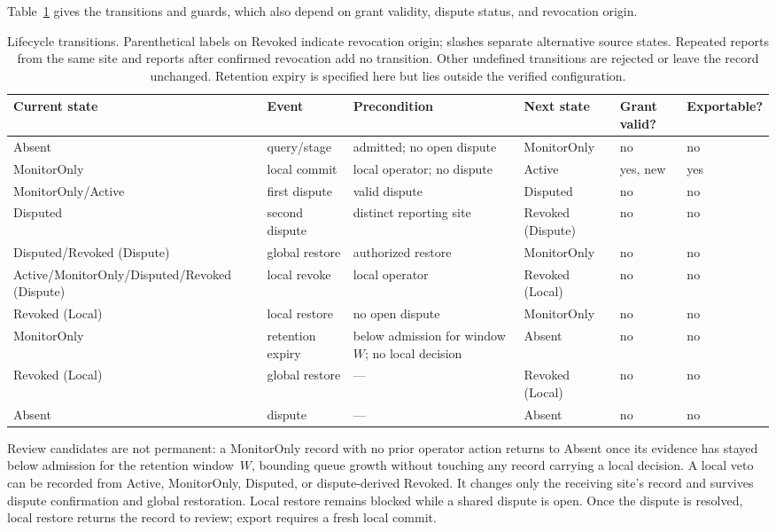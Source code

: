 \documentclass[journal]{IEEEtran}
\theoremstyle{definition}
\begin{document}

Table~\ref{tab:transitions} gives the transitions and guards, which also depend on grant validity, dispute status, and revocation origin.
\begin{table}[ht]
\centering
\caption{Lifecycle transitions. Parenthetical labels on Revoked indicate revocation origin; slashes separate alternative source states. Repeated reports from the same site and reports after confirmed revocation add no transition. Other undefined transitions are rejected or leave the record unchanged. Retention expiry is specified here but lies outside the verified configuration.}
\label{tab:transitions}
\scriptsize
\begin{tabular}{@{}llllll@{}}
\toprule
Current state & Event & Precondition & Next state & Grant valid? & Exportable? \\
\midrule
Absent & query/stage & admitted; no open dispute & MonitorOnly & no & no \\
MonitorOnly & local commit & local operator; no dispute & Active & yes, new & yes \\
MonitorOnly/Active & first dispute & valid dispute & Disputed & no & no \\
Disputed & second dispute & distinct reporting site & Revoked (Dispute) & no & no \\
Disputed/Revoked (Dispute) & global restore & authorized restore & MonitorOnly & no & no \\
Active/MonitorOnly/Disputed/Revoked (Dispute) & local revoke & local operator & Revoked (Local) & no & no \\
Revoked (Local) & local restore & no open dispute & MonitorOnly & no & no \\
MonitorOnly & retention expiry & below admission for window $W$; no local decision & Absent & no & no \\
Revoked (Local) & global restore & --- & Revoked (Local) & no & no \\
Absent & dispute & --- & Absent & no & no \\
\bottomrule
\end{tabular}
\end{table}

Review candidates are not permanent: a MonitorOnly record with no prior operator action returns to Absent once its evidence has stayed below admission for the retention window~$W$, bounding queue growth without touching any record carrying a local decision. A local veto can be recorded from Active, MonitorOnly, Disputed, or dispute-derived Revoked. It changes only the receiving site's record and survives dispute confirmation and global restoration. Local restore remains blocked while a shared dispute is open. Once the dispute is resolved, local restore returns the record to review; export requires a fresh local commit.
\end{document}
